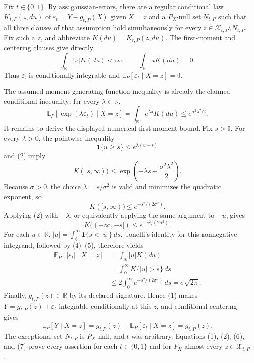 Fix \(t\in\{0,1\}\). By \(\mathrm{ass:gaussian\text{-}errors}\), there are a regular conditional law \(K_{t,P}(z,du)\) of \(\varepsilon_t=Y-g_{t,P}(X)\) given \(X=z\) and a \(P_X\)-null set \(N_{t,P}\) such that all three clauses of that assumption hold simultaneously for every \(z\in\mathcal X_{t,P}\setminus N_{t,P}\). Fix such a \(z\), and abbreviate \(K(du)=K_{t,P}(z,du)\). The first-moment and centering clauses give directly
\[
 \int_{\mathbb R}|u|K(du)<\infty,
 \qquad
 \int_{\mathbb R}uK(du)=0.
 \tag{1}
\]
Thus \(\varepsilon_t\) is conditionally integrable and \(\mathbb E_P[\varepsilon_t\mid X=z]=0\).

The assumed moment-generating-function inequality is already the claimed conditional inequality: for every \(\lambda\in\mathbb R\),
\[
 \mathbb E_P[\exp(\lambda\varepsilon_t)\mid X=z]
 =\int_{\mathbb R}e^{\lambda u}K(du)
 \le e^{\sigma^2\lambda^2/2}.
 \tag{2}
\]
It remains to derive the displayed numerical first-moment bound. Fix \(s>0\). For every \(\lambda>0\), the pointwise inequality
\[
 \mathbf 1\{u\ge s\}\le e^{\lambda(u-s)}
\]
and (2) imply
\[
 K([s,\infty))
 \le \exp\!\left(-\lambda s+\frac{\sigma^2\lambda^2}{2}\right).
 \tag{3}
\]
Because \(\sigma>0\), the choice \(\lambda=s/\sigma^2\) is valid and minimizes the quadratic exponent, so
\[
 K([s,\infty))\le e^{-s^2/(2\sigma^2)}.
 \tag{4}
\]
Applying (2) with \(-\lambda\), or equivalently applying the same argument to \(-u\), gives
\[
 K(({-\infty},-s])\le e^{-s^2/(2\sigma^2)}.
 \tag{5}
\]
For each \(u\in\mathbb R\), \(|u|=\int_0^\infty\mathbf 1\{s<|u|\}\,ds\). Tonelli's identity for this nonnegative integrand, followed by (4)--(5), therefore yields
\[
 \begin{aligned}
 \mathbb E_P[|\varepsilon_t|\mid X=z]
 &=\int_{\mathbb R}|u|K(du)\\
 &=\int_0^\infty K\{|u|>s\}\,ds\\
 &\le 2\int_0^\infty e^{-s^2/(2\sigma^2)}\,ds
 =\sigma\sqrt{2\pi}.
 \end{aligned}
 \tag{6}
\]
Finally, \(g_{t,P}(z)\in\mathbb R\) by its declared signature. Hence (1) makes \(Y=g_{t,P}(z)+\varepsilon_t\) integrable conditionally at this \(z\), and conditional centering gives
\[
 \mathbb E_P[Y\mid X=z]
 =g_{t,P}(z)+\mathbb E_P[\varepsilon_t\mid X=z]
 =g_{t,P}(z).
 \tag{7}
\]
The exceptional set \(N_{t,P}\) is \(P_X\)-null, and \(t\) was arbitrary. Equations (1), (2), (6), and (7) prove every assertion for each \(t\in\{0,1\}\) and for \(P_X\)-almost every \(z\in\mathcal X_{t,P}\).